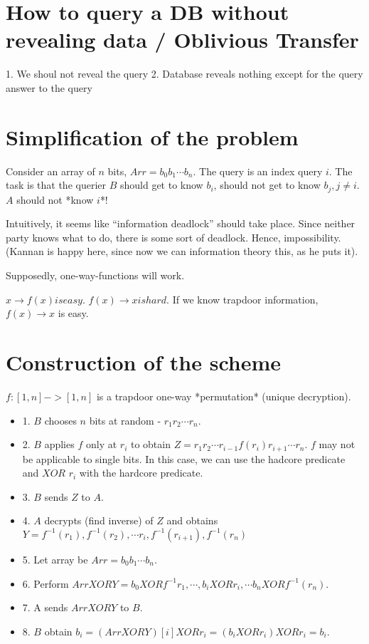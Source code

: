 \section{How to query a DB without revealing data / Oblivious Transfer}

1. We shoul not reveal the query
2. Database reveals nothing except for the query answer to the query


\section{Simplification of the problem}
Consider an array of $n$ bits, $Arr = b_0 b_1 \cdots b_n$. The query is an index query $i$.
The task is that the querier $B$ should get to know $b_i$, should not get to know
$b_j, j \neq i$. $A$ should not *know $i$*!

Intuitively, it seems like ``information deadlock'' should take place. Since neither
party knows what to do, there is some sort of deadlock. Hence, impossibility. (Kannan
is happy here, since now we can information theory this, as he puts it).

Supposedly, one-way-functions will work.

$x \rightarrow f(x) is easy$.
$f(x) \rightarrow x is hard$. If we know trapdoor information,
$f(x) \rightarrow x$ is easy.

\section{Construction of the scheme}

$f: [1, n] -> [1, n]$ is a trapdoor one-way *permutation* (unique decryption).

\begin{itemize}
\item 1. $B$ chooses $n$ bits at random - $r_1 r_2 \cdots r_n$.
\item 2. $B$ applies $f$ only at $r_i$ to obtain $Z = r_1 r_2 \cdots r_{i -1} f(r_i) r_{i + 1} \cdots r_n$.
  $f$ may not be applicable to single bits. In this case, we can use the hadcore predicate and $XOR$ $r_i$ with the
  hardcore predicate.
\item 3. $B$ sends $Z$ to $A$.
\item 4. $A$ decrypts (find inverse) of $Z$ and obtains $Y = f^{-1}(r_1), f^{-1}(r_2), \cdots r_i, f^{-1}(r_{i + 1}), f^{-1}(r_n)$
\item 5. Let array be $Arr = b_0 b_1 \cdots b_n$.
\item 6. Perform $Arr XOR Y = b_0 XOR f^{-1}r_1, \cdots , b_{i} XOR r_i, \cdots b_n XOR f^{-1}(r_n)$.
\item 7. A sends $Arr XOR Y$ to $B$.
\item 8. $B$ obtain $b_i = (Arr XOR Y)[i] XOR r_i = (b_{i} XOR r_i) XOR r_i = b_i$.
\end{itemize}

